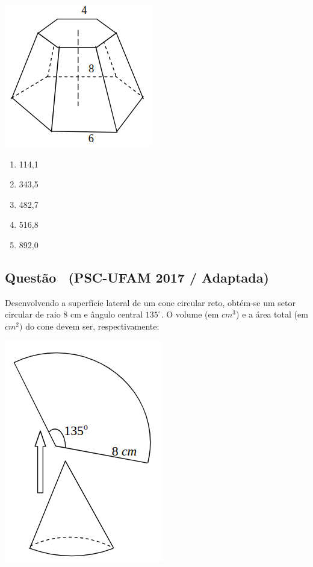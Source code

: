 \documentclass[12pt]{article}
\newif\ifmostravermelho
\newcommand{\vermelho}[1]{%
  \ifmostravermelho
    {\color{red}#1}%
  \else
    #1%
  \fi
}
\newcounter{questao}
\newcommand{\novaquestao}[1]{%
  \stepcounter{questao}%
  \subsection*{Questão \thequestao\ (#1)}%
}
\begin{document}
\begin{multicols}{2}
            \begin{center}
                \includegraphics[scale=0.6]{q8.png}
            \end{center}
            \begin{enumerate}[label=(\Alph*), noitemsep]
                \item 114,1
                \item 343,5
                \item 482,7
                \item \vermelho{516,8}  %
                \item 892,0
            \end{enumerate}
        
        \novaquestao{PSC-UFAM 2017 / Adaptada}
            Desenvolvendo a superfície lateral de um cone circular reto, obtém-se um setor circular de raio 8 cm e ângulo central $135^\circ$. O volume (em $cm^{3}$) e a área total (em $cm^{2})$ do cone devem ser, respectivamente:

            \begin{center}
                \includegraphics[scale=0.6]{q10.png}
            \end{center}
        

\end{multicols}
\end{document}
